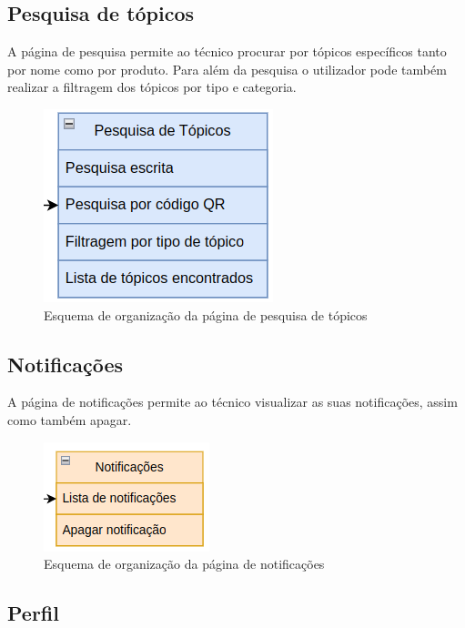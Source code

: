 \subsection{Pesquisa de tópicos}

A página de pesquisa permite ao técnico procurar por tópicos específicos tanto por nome como por produto. Para além da pesquisa o utilizador pode também realizar a filtragem dos 
tópicos por tipo e categoria.
\begin{figure}[htb]
  \centering
  
  \includegraphics[height=0.3\textwidth]{images/Arquiteturas/superficial_de_app/pesquisa_forum.png}
  \caption{Esquema de organização da página de pesquisa de tópicos}
  \label{fig:8}
\end{figure}

\newpage

\subsection{Notificações}

A página de notificações permite ao técnico visualizar as suas notificações, assim como também apagar.
\begin{figure}[htb]
  \centering
  
  \includegraphics[height=0.2\textwidth]{images/Arquiteturas/superficial_de_app/notificacoes.png}
  \caption{Esquema de organização da página de notificações}
  \label{fig:9}
\end{figure}

\subsection{Perfil}

